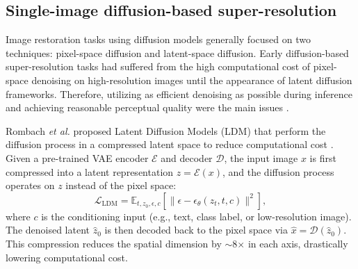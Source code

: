 \subsection{Single-image diffusion-based super-resolution}

Image restoration tasks using diffusion models generally focused 
on two techniques: pixel-space diffusion and latent-space 
diffusion. Early diffusion-based super-resolution tasks had 
suffered from the high computational cost of pixel-space 
denoising on high-resolution images until the appearance of 
latent diffusion frameworks. Therefore, utilizing as efficient 
denoising as possible during inference and achieving reasonable 
perceptual quality were the main issues \cite{ho2020ddpm}.

Rombach \emph{et al.} proposed Latent Diffusion Models (LDM) 
that perform the diffusion process in a compressed latent space 
to reduce computational cost \cite{rombach2022ldm}. Given a 
pre-trained VAE encoder $\mathcal{E}$ and decoder $\mathcal{D}$, 
the input image $x$ is first compressed into a latent 
representation $z = \mathcal{E}(x)$, and the diffusion process 
operates on $z$ instead of the pixel space:
\begin{equation}
    \mathcal{L}_{\mathrm{LDM}} = 
    \mathbb{E}_{t, z_0, \epsilon, c} \!\left[ 
    \big\| \epsilon - \epsilon_\theta(z_t, t, c) \big\|^2 \right],
    \label{eq:ldm_loss}
\end{equation}
where $c$ is the conditioning input (e.g., text, class label, 
or low-resolution image). The denoised latent $\hat{z}_0$ is 
then decoded back to the pixel space via $\hat{x} = 
\mathcal{D}(\hat{z}_0)$. This compression reduces the spatial 
dimension by $\sim$8$\times$ in each axis, drastically lowering 
computational cost.


